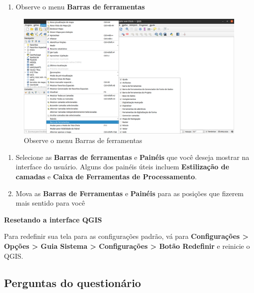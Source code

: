 \documentclass[
  portuguese,
]{krantz}
\providecommand{\tightlist}{%
  \setlength{\itemsep}{0pt}\setlength{\parskip}{0pt}}
\begin{document}
\begin{enumerate}
\def\labelenumi{\arabic{enumi}.}
\setcounter{enumi}{3}
\tightlist
\item
  Observe o menu \textbf{Barras de ferramentas}
\end{enumerate}

\begin{figure}
\centering
\includegraphics{media/modulo1/ex01-03.png}
\caption{Observe o menu Barras de ferramentas}
\end{figure}

\begin{enumerate}
\def\labelenumi{\arabic{enumi}.}
\setcounter{enumi}{4}
\tightlist
\item
  Selecione as \textbf{Barras de ferramentas} e \textbf{Painéis} que você deseja mostrar na interface do usuário. Alguns dos painéis úteis incluem \textbf{Estilização de camadas} e \textbf{Caixa de Ferramentas de Processamento}.
\item
  Mova as \textbf{Barras de Ferramentas} e \textbf{Painéis} para as posições que fizerem mais sentido para você
\end{enumerate}

\textbf{Resetando a interface QGIS}

Para redefinir sua tela para as configurações padrão, vá para \textbf{Configurações \textgreater{} Opções \textgreater{} Guia Sistema \textgreater{} Configurações \textgreater{} Botão Redefinir} e reinicie o QGIS.

\hypertarget{perguntas-do-questionuxe1rio-1}{%
\subsection{\texorpdfstring{\textbf{Perguntas do questionário}}{Perguntas do questionário}}\label{perguntas-do-questionuxe1rio-1}}
\end{document}
